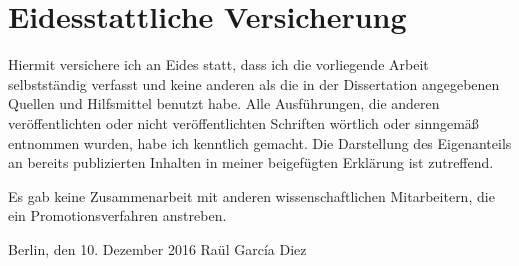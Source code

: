 
\section*{Eidesstattliche Versicherung}
\vspace{3ex}

Hiermit versichere ich an Eides statt, dass ich die vorliegende Arbeit selbstständig verfasst und keine anderen als die in der Dissertation angegebenen Quellen und Hilfsmittel benutzt habe.
Alle Ausführungen, die anderen veröffentlichten oder nicht veröffentlichten Schriften wörtlich oder sinngemäß entnommen wurden, habe ich kenntlich gemacht.
Die Darstellung des Eigenanteils an bereits publizierten Inhalten in meiner beigefügten Erklärung ist zutreffend.

Es gab keine Zusammenarbeit mit anderen wissenschaftlichen Mitarbeitern, die ein Promotionsverfahren anstreben.

\vspace{3cm}

\noindent Berlin, den 10. Dezember 2016 \hfill Raül Garc\'{i}a Diez

\cleardoublepage
